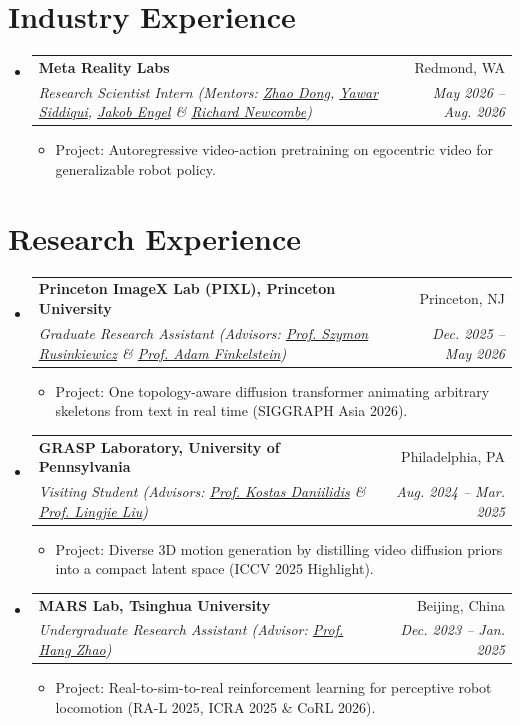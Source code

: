 \documentclass[letterpaper,11pt]{article}
\makeatletter
\newlength{\gapEntry}     \setlength{\gapEntry}{-2pt}     %
\newlength{\gapEntryEnd}  \setlength{\gapEntryEnd}{-6pt}  %
\newlength{\gapItem}      \setlength{\gapItem}{-2pt}      %
\newlength{\gapList}      \setlength{\gapList}{-4pt}      %
\newcommand{\link}[2]{\href{#1}{\textcolor{AcademicBlue}{#2}}} %
\newcommand{\resumeSubHeadingListStart}{\begin{itemize}[leftmargin=0.0in, label={}]}
\newcommand{\resumeSubHeadingListEnd}{\end{itemize}}
\newcommand{\resumeItemListStart}{\begin{itemize}[leftmargin=0.15in]}
\newcommand{\resumeItemListEnd}{\end{itemize}\vspace{\gapList}}
\newcommand{\resumeItem}[1]{%
  \item\small{{#1 \vspace{\gapItem}}}
}
\newcommand{\resumeHeading}[4]{%
  \vspace{\gapEntry}\item
    \begin{tabular*}{1.0\textwidth}[t]{l@{\extracolsep{\fill}}r}
      \textbf{#1} & \small #2 \\
      \textit{\small #3} & \textit{\small #4} \\
    \end{tabular*}\vspace{\gapEntryEnd}
}
\makeatother
\begin{document}
\section{Industry Experience}
\resumeSubHeadingListStart
    \resumeHeading
      {Meta Reality Labs}{Redmond, WA}
      {Research Scientist Intern \quad (Mentors: \link{https://flycooler.com/}{Zhao Dong}, \link{https://nihalsid.github.io/}{Yawar Siddiqui}, \link{https://jakobengel.github.io/}{Jakob Engel} \& \link{https://scholar.google.com/citations?user=MhowvPkAAAAJ}{Richard Newcombe})}{May 2026 -- Aug. 2026}
    \resumeItemListStart
        \resumeItem{Project: Autoregressive video-action pretraining on egocentric video for generalizable robot policy.}
    \resumeItemListEnd
\resumeSubHeadingListEnd

\section{Research Experience}
\resumeSubHeadingListStart
    \resumeHeading
      {Princeton ImageX Lab (PIXL), Princeton University}{Princeton, NJ}
      {Graduate Research Assistant \quad (Advisors: \link{https://www.cs.princeton.edu/~smr/}{Prof. Szymon Rusinkiewicz} \& \link{https://www.cs.princeton.edu/~af/}{Prof. Adam Finkelstein})}{Dec. 2025 -- May 2026}
    \resumeItemListStart
        \resumeItem{Project: One topology-aware diffusion transformer animating arbitrary skeletons from text in real time (SIGGRAPH Asia 2026).}
    \resumeItemListEnd

    \resumeHeading
      {GRASP Laboratory, University of Pennsylvania}{Philadelphia, PA}
      {Visiting Student \quad (Advisors: \link{https://www.cis.upenn.edu/~kostas/}{Prof. Kostas Daniilidis} \& \link{https://lingjie0206.github.io/}{Prof. Lingjie Liu})}{Aug. 2024 -- Mar. 2025}
    \resumeItemListStart
        \resumeItem{Project: Diverse 3D motion generation by distilling video diffusion priors into a compact latent space (ICCV 2025 Highlight).}
    \resumeItemListEnd

    \resumeHeading
      {MARS Lab, Tsinghua University}{Beijing, China}
      {Undergraduate Research Assistant \quad (Advisor: \link{https://hangzhaomit.github.io/}{Prof. Hang Zhao})}{Dec. 2023 -- Jan. 2025}
    \resumeItemListStart
        \resumeItem{Project: Real-to-sim-to-real reinforcement learning for perceptive robot locomotion (RA-L 2025, ICRA 2025 \& CoRL 2026).}
    \resumeItemListEnd
\resumeSubHeadingListEnd
\end{document}
